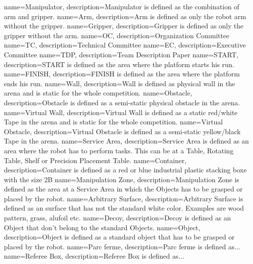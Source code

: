 {
	name=Manipulator,
	description={Manipulator is defined as the combination of arm and gripper.}
}
{
	name=Arm,
	description={Arm is defined as only the robot arm without the gripper.}
}
{
	name=Gripper,
	description={Gripper is defined as only the gripper without the arm.}
}
{
	name=OC,
	description={Organization Committee}
}
{
	name=TC,
	description={Technical Committee}
}
{
	name=EC,
	description={Executive Committee}
}
{
	name=TDP,
	description={Team Description Paper}
}
{
	name=START,
	description={START is defined as the area where the platform starts his run.}
}
{
	name=FINISH,
	description={FINISH is defined as the area where the platform ends his run.}
}
{
	name=Wall,
	description={Wall is defined as physical wall in the arena and is static for the whole competition.}
}
{
	name=Obstacle,
	description={Obstacle is defined as a semi-static physical obstacle in the arena.}
}
{
	name=Virtual Wall,
	description={Virtual Wall is defined as a static red/white Tape in the arena and is static for the whole competition.}
}
{
	name=Virtual Obstacle,
	description={Virtual Obstacle is defined as a semi-static yellow/black Tape in the arena.}
}
{
	name=Service Area,
	description={Service Area is defined as an area where the robot has to perform tasks. This can be at a Table, Rotating Table, Shelf or Precision Placement Table.}
}
{
	name=Container,
	description={Container is defined as a red or blue industrial plastic stacking boxe with the size 2B }
}
{
	name=Manipulation Zone,
	description={Manipulation Zone is defined as the area at a Service Area in which the Objects has to be grasped or placed by the robot.}
}
{
	name=Arbitrary Surface,
	description={Arbitrary Surface is defined as an surface that has not the standard white color. Examples are wood pattern, grass, alufoil etc.}
}
{
	name=Decoy,
	description={Decoy is defined as an Object that don't belong to the standard Objects.}
}
{
	name=Object,
	description={Object is defined as a standard object that has to be grasped or placed by the robot.}
}
{
	name=Parc ferme,
	description={Parc ferme is defined as...}
}
{
	name=Referee Box,
	description={Referee Box is defined as...}
}

